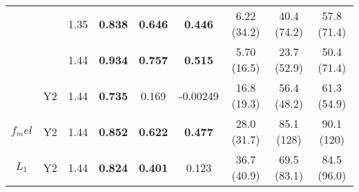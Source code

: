 \begin{table}[htb!]
\begin{tabular}{|ccc|ccc|ccc|}
        & & 1.35 & \textbf{0.838} & \textbf{0.646} & \textbf{0.446} & 6.22 (34.2) & 40.4 (74.2) & 57.8 (71.4) \\
        & & 1.44 & \textbf{0.934} & \textbf{0.757} & \textbf{0.515} & 5.70 (16.5) & 23.7 (52.9) & 50.4 (71.4) \\
        \cline{2-9}
        & Y2 & 1.44 & \textbf{0.735} & 0.169 & -0.00249 & 16.8 (19.3) & 56.4 (48.2) & 61.3 (54.9) \\
        \hline
        $f_mel$ & Y2 & 1.44 & \textbf{0.852} & \textbf{0.622} & \textbf{0.477} & 28.0 (31.7) & 85.1 (128) & 90.1 (120) \\
        \hline
        $L_1$ & Y2 & 1.44 & \textbf{0.824} & \textbf{0.401} & 0.123 & 36.7 (40.9) & 69.5 (83.1) & 84.5 (96.0) \\
        \hline
    \end{tabular}    
    \label{ap:backwardsHSIMCq}
\end{table}

